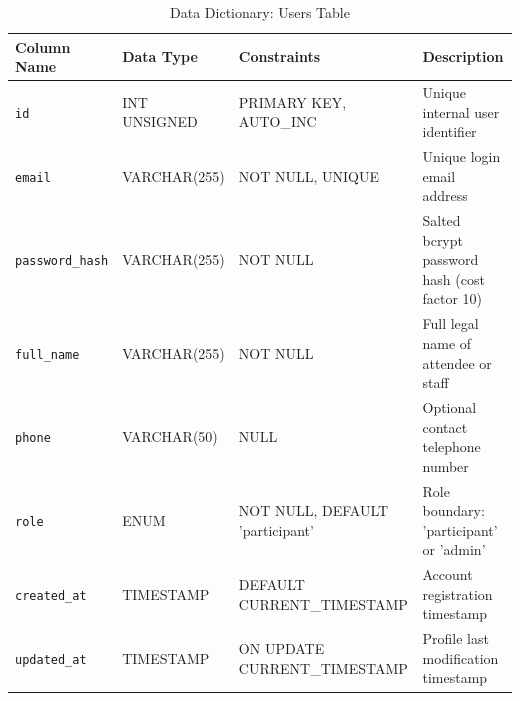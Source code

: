 \documentclass[11pt,a4paper]{report}
\begin{document}
\begin{table}[H]
\centering
\fontsize{8.5}{11}\selectfont
\renewcommand{\arraystretch}{1.3}
\setlength{\tabcolsep}{4pt}
\caption{Data Dictionary: Users Table}
\label{tab:dict_users}
\begin{tabularx}{\textwidth}{|p{}|p{}|p{}|X|}
\hline
\rowcolor{TCSBlue}
\color{white}\bfseries Column Name & 
\color{white}\bfseries Data Type & 
\color{white}\bfseries Constraints & 
\color{white}\bfseries Description \\\hline

\texttt{id} & INT UNSIGNED & PRIMARY KEY, AUTO\_INC & Unique internal user identifier \\\hline
\texttt{email} & VARCHAR(255) & NOT NULL, UNIQUE & Unique login email address \\\hline
\texttt{password\_hash} & VARCHAR(255) & NOT NULL & Salted bcrypt password hash (cost factor 10) \\\hline
\texttt{full\_name} & VARCHAR(255) & NOT NULL & Full legal name of attendee or staff \\\hline
\texttt{phone} & VARCHAR(50) & NULL & Optional contact telephone number \\\hline
\texttt{role} & ENUM & NOT NULL, DEFAULT 'participant' & Role boundary: 'participant' or 'admin' \\\hline
\texttt{created\_at} & TIMESTAMP & DEFAULT CURRENT\_TIMESTAMP & Account registration timestamp \\\hline
\texttt{updated\_at} & TIMESTAMP & ON UPDATE CURRENT\_TIMESTAMP & Profile last modification timestamp \\\hline
\end{tabularx}
\end{table}
\end{document}
